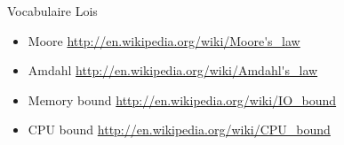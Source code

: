 \begin{Frame}{Vocabulaire Lois}
  \begin{itemize}
  \item Moore \url{http://en.wikipedia.org/wiki/Moore's_law}
  \item Amdahl \url{http://en.wikipedia.org/wiki/Amdahl's_law}
  \item Memory bound \url{http://en.wikipedia.org/wiki/IO_bound}
  \item CPU bound \url{http://en.wikipedia.org/wiki/CPU_bound}
  \end{itemize}
\end{Frame}



